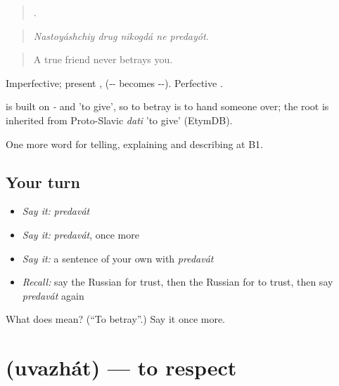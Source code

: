 \begin{quote}
    .
\end{quote}

\begin{quote}
\emph{Nastoyáshchiy drug nikogdá ne predayót.}
\end{quote}

\begin{quote}
A true friend never betrays you.
\end{quote}

Imperfective; present ,  (-- becomes --). Perfective .

\begin{cousinweb}
\emph{} is built on \emph{-} and \emph{} 'to give', so to betray is to hand someone over; the root is inherited from Proto-Slavic \emph{dati} 'to give' (EtymDB).
\end{cousinweb}

\begin{grammarlens}[title={What you've built}]
One more word for telling, explaining and describing at B1.
\end{grammarlens}

\subsection*{Your turn}
\begin{itemize}
\raggedright
  \item \emph{Say it:} \emph{predavát}
  \item \emph{Say it:} \emph{predavát}, once more
  \item \emph{Say it:} a sentence of your own with \emph{predavát}
  \item \emph{Recall:} say the Russian for trust, then the Russian for to trust, then say \emph{predavát} again
\end{itemize}

\begin{tcolorbox}[breakable,colback=teal!4,colframe=teal!35!black,title={Before you move on}]
What does  mean? (\textquotedblleft{}To betray\textquotedblright{}.) Say it once more.
\end{tcolorbox}
\section[\texorpdfstring{\ru{уважать} (uvazhát)}{уважать (uvazhát)}]{ (uvazhát) — to respect}

